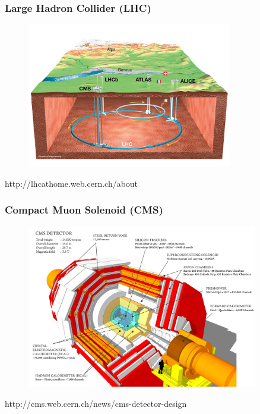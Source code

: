 \begin{frame}\frametitle{Large Hadron Collider (LHC)}
  \begin{figure}[htb]
    \begin{center}
      \includegraphics[width=0.80\textwidth]{../figs/ForPresentation/LHC.png}
    \end{center}
  \end{figure}
\tiny
http://lhcathome.web.cern.ch/about
\end{frame}%

\begin{frame}\frametitle{Compact Muon Solenoid (CMS)}
\begin{figure}[htb]
  \begin{center}
    \includegraphics[width=0.90\textwidth]{../figs/ForPresentation/CMS.png}
  \end{center}
\end{figure}
\tiny
http://cms.web.cern.ch/news/cms-detector-design
\end{frame}%


